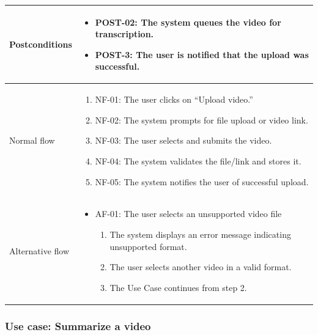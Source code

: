 \begin{table}[H]
    \begin{tabular}{|>{\raggedright\arraybackslash}p{}|>{\raggedright\arraybackslash}p{}|}
        \hline
        Postconditions &
        \begin{itemize}
            \item POST-02: The system queues the video for transcription.
            \item POST-3: The user is notified that the upload was successful.
        \end{itemize} \\
        \hline
        Normal flow &
        \begin{enumerate}
            \item NF-01: The user clicks on “Upload video.”
            \item NF-02: The system prompts for file upload or video link.
            \item NF-03: The user selects and submits the video.
            \item NF-04: The system validates the file/link and stores it.
            \item NF-05: The system notifies the user of successful upload.
        \end{enumerate} \\
        \hline
        Alternative flow &
        \begin{itemize}
            \item AF-01:  The user selects an unsupported video file
            \begin{enumerate}
                \item The system displays an error message indicating unsupported format.
                \item The user selects another video in a valid format.
                \item The Use Case continues from step 2.
            \end{enumerate}
        \end{itemize} \\
        \hline
    \end{tabular}
\end{table}

\subsubsection{Use case: Summarize a video}
\newpage


